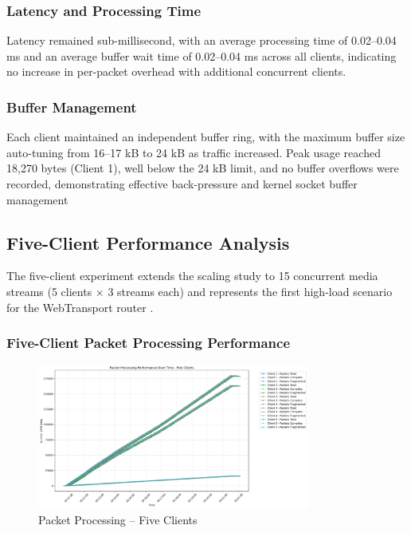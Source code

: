 \subsubsection{Latency and Processing Time}
Latency remained sub-millisecond, with an average processing time of 0.02–0.04 ms and an average buffer wait time of 0.02–0.04 ms across all clients, indicating no increase in per-packet overhead with additional concurrent clients.
\subsubsection{Buffer Management}
Each client maintained an independent buffer ring, with the maximum buffer size auto-tuning from 16–17 kB to 24 kB as traffic increased. Peak usage reached 18,270 bytes (Client 1), well below the 24 kB limit, and no buffer overflows were recorded, demonstrating effective back-pressure and kernel socket buffer management


\subsection{Five-Client Performance Analysis}
The five-client experiment extends the scaling study to 15 concurrent media streams (5 clients × 3 streams each) and represents the first high-load scenario for the WebTransport router \cite{rfc9000}.

\subsubsection{Five-Client Packet Processing Performance}

\begin{figure}[H]
\centering
\includegraphics[width=0.8\textwidth]{Evaluation/packet_processing_by_client_five-clients.png}
\caption{Packet Processing – Five Clients}
\label{fig:packet-processing-five-clients}
\end{figure}

